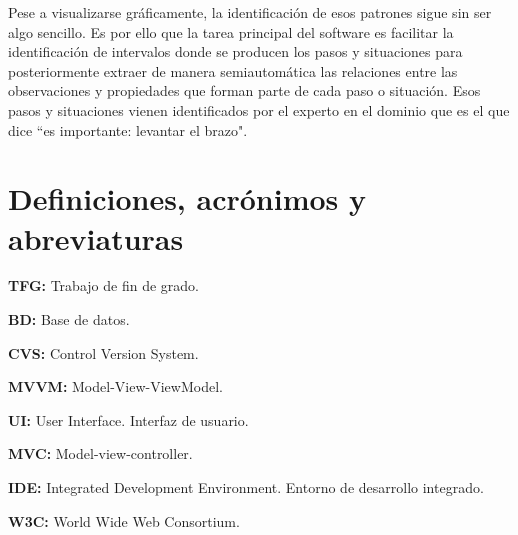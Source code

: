 Pese a visualizarse gr\'aficamente, la identificaci\'on de esos patrones sigue sin ser algo sencillo. Es
por ello que la tarea principal del software es facilitar la identificaci\'on de intervalos donde se producen los
pasos y situaciones para posteriormente extraer de manera semiautom\'atica las relaciones entre las observaciones y
propiedades que forman parte de cada paso o situaci\'on. Esos pasos y situaciones vienen identificados por el
experto en el dominio que es el que dice ``es importante: levantar el brazo".

\section{Definiciones, acr\'{o}nimos y abreviaturas}
\textbf{TFG:} Trabajo de fin de grado.

\textbf{BD:} Base de datos.

\textbf{CVS:} Control Version System.

\textbf{MVVM:} Model-View-ViewModel.

\textbf{UI:} User Interface. Interfaz de usuario.

\textbf{MVC:} Model-view-controller.

\textbf{IDE:} Integrated Development Environment. Entorno de desarrollo integrado.

\textbf{W3C:} World Wide Web Consortium.
 
